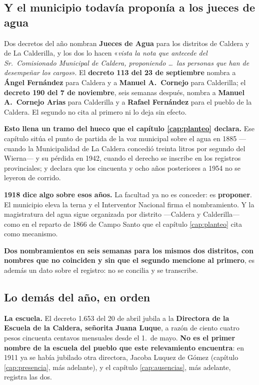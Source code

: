 \subsection*{Y el municipio todavía proponía a los jueces de agua}

Dos decretos del año nombran \textbf{Jueces de Agua} para los distritos de Caldera y de La
Calderilla, y los dos lo hacen «\textit{vista la nota que antecede del Sr.\ Comisionado Municipal
de Caldera, proponiendo \ldots\ las personas que han de desempeñar los cargos}». El
\textbf{decreto 113 del 23 de septiembre} nombra a \textbf{Ángel Fernández} para Caldera y a
\textbf{Manuel A.\ Cornejo} para Calderilla; el \textbf{decreto 190 del 7 de noviembre}, seis
semanas después, nombra a \textbf{Manuel A.\ Cornejo Arias} para Calderilla y a \textbf{Rafael
Fernández} para el pueblo de la Caldera. El segundo no cita al primero ni lo deja sin efecto.

\begin{cautela}
\textbf{Esto llena un tramo del hueco que el capítulo \ref{cap:planteo} declara.} Ese capítulo
sitúa el punto de partida de la voz municipal sobre el agua en 1885 ---cuando la Municipalidad de
La Caldera concedió treinta litros por segundo del Wierna--- y su pérdida en 1942, cuando el
derecho se inscribe en los registros provinciales; y declara que los cincuenta y ocho años
posteriores a 1954 no se leyeron de corrido.

\textbf{1918 dice algo sobre esos años.} La facultad ya no es conceder: es \textbf{proponer}. El
municipio eleva la terna y el Interventor Nacional firma el nombramiento. Y la magistratura del
agua sigue organizada por distrito ---Caldera y Calderilla--- como en el reparto de 1866 de Campo
Santo que el capítulo \ref{cap:planteo} cita como mecanismo.

\textbf{Dos nombramientos en seis semanas para los mismos dos distritos, con nombres que no
coinciden y sin que el segundo mencione al primero}, es además un dato sobre el registro: no se
concilia y se transcribe.
\end{cautela}

\subsection*{Lo demás del año, en orden}

\textbf{La escuela.} El decreto 1.653 del 20 de abril jubila a la \textbf{Directora de la Escuela
de la Caldera, señorita Juana Luque}, a razón de ciento cuatro pesos cincuenta centavos mensuales
desde el 1.\ de mayo. \textbf{No es el primer nombre de la escuela del pueblo que este relevamiento
encuentra}: en 1911 ya se había jubilado otra directora, Jacoba Luquez de Gómez (capítulo \ref{cap:presencia}, más adelante), y el capítulo \ref{cap:ausencias}, más adelante, registra las dos.

